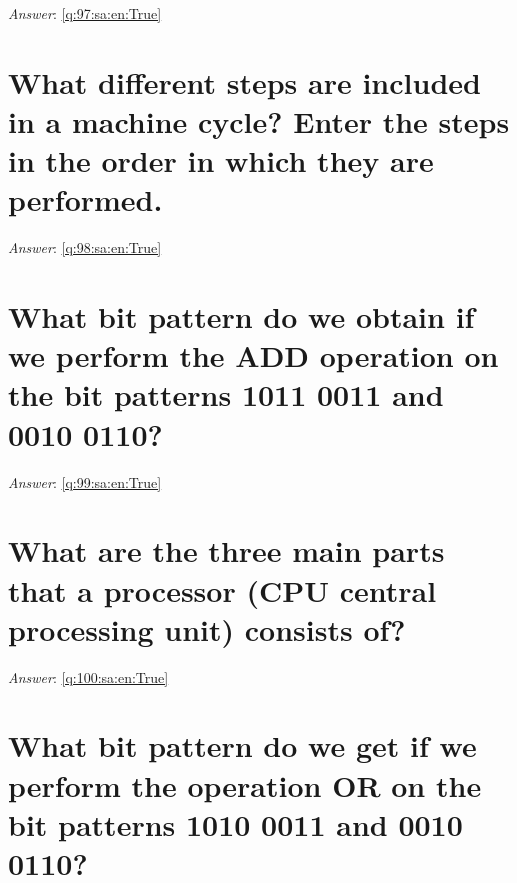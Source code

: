 \documentclass[a4paper,11pt,oneside]{book}
\begin{document}
\begin{sloppypar}
\vspace{1cm}

\textit{Answer}: \autoref{q:97:sa:en:True}



\section{What different steps are included in a machine cycle? Enter the steps in the order in which they are performed.}

\label{q:98:sa:en:False}

\vspace{2cm}

\noindent\makebox[\textwidth]{\hrulefill}

\vspace{1cm}

\textit{Answer}: \autoref{q:98:sa:en:True}



\section{What bit pattern do we obtain if we perform the ADD operation on the bit patterns 1011 0011 and 0010 0110?}

\label{q:99:sa:en:False}

\vspace{2cm}

\noindent\makebox[\textwidth]{\hrulefill}

\vspace{1cm}

\textit{Answer}: \autoref{q:99:sa:en:True}



\section{What are the three main parts that a processor (CPU {\textendash} central processing unit) consists of?}

\label{q:100:sa:en:False}

\vspace{2cm}

\noindent\makebox[\textwidth]{\hrulefill}

\vspace{1cm}

\textit{Answer}: \autoref{q:100:sa:en:True}



\section{What bit pattern do we get if we perform the operation OR on the bit patterns 1010 0011 and 0010 0110?}


\end{sloppypar}
\end{document}
